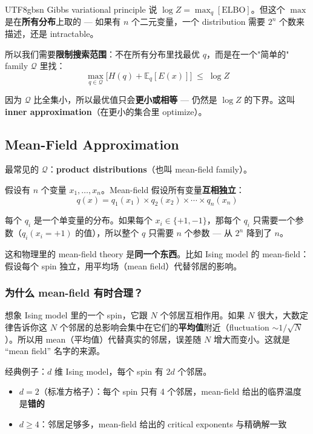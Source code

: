 \documentclass[11pt]{article}
\begin{document}
\begin{CJK}{UTF8}{gbsn}
Gibbs variational principle 说 $\log Z = \max_q [\text{ELBO}]$。但这个 $\max$ 是在\textbf{所有分布}上取的 --- 如果有 $n$ 个二元变量，一个 distribution 需要 $2^n$ 个数来描述，还是 intractable。

所以我们需要\textbf{限制搜索范围}：不在所有分布里找最优 $q$，而是在一个"简单的" family $\mathcal{Q}$ 里找：
\[
  \max_{q \in \mathcal{Q}} \Big[ H(q) + \mathbb{E}_q[E(x)] \Big] \;\leq\; \log Z
\]

因为 $\mathcal{Q}$ 比全集小，所以最优值只会\textbf{更小或相等} --- 仍然是 $\log Z$ 的下界。这叫 \textbf{inner approximation}（在更小的集合里 optimize）。

\subsection{Mean-Field Approximation}

最常见的 $\mathcal{Q}$：\textbf{product distributions}（也叫 mean-field family）。

假设有 $n$ 个变量 $x_1, \dots, x_n$。Mean-field 假设所有变量\textbf{互相独立}：
\[
  q(x) = q_1(x_1) \times q_2(x_2) \times \cdots \times q_n(x_n)
\]

每个 $q_i$ 是一个单变量的分布。如果每个 $x_i \in \{+1, -1\}$，那每个 $q_i$ 只需要一个参数（$q_i(x_i = +1)$ 的值），所以整个 $q$ 只需要 $n$ 个参数 --- 从 $2^n$ 降到了 $n$。

这和物理里的 mean-field theory 是\textbf{同一个东西}。比如 Ising model 的 mean-field：假设每个 spin 独立，用平均场（mean field）代替邻居的影响。

\subsubsection{为什么 mean-field 有时合理？}

想象 Ising model 里的一个 spin，它跟 $N$ 个邻居互相作用。如果 $N$ 很大，大数定律告诉你这 $N$ 个邻居的总影响会集中在它们的\textbf{平均值}附近（fluctuation $\sim 1/\sqrt{N}$）。所以用 mean（平均值）代替真实的邻居，误差随 $N$ 增大而变小。这就是 ``mean field'' 名字的来源。

经典例子：$d$ 维 Ising model，每个 spin 有 $2d$ 个邻居。
\begin{itemize}
  \item $d=2$（标准方格子）：每个 spin 只有 4 个邻居，mean-field 给出的临界温度是\textbf{错的}
  \item $d \geq 4$：邻居足够多，mean-field 给出的 critical exponents 与精确解一致
\end{itemize}


\end{CJK}
\end{document}
